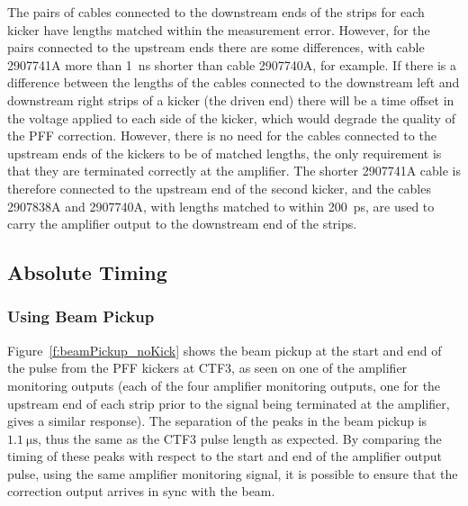 The pairs of cables connected to the downstream ends of the strips for
 each kicker have lengths matched within the measurement error.
 However, for the pairs connected to the upstream ends there are some differences, with cable 2907741A more than 1~ns shorter than cable 2907740A, for example. If there is a difference between the lengths of the cables connected to the downstream left and downstream right strips of a kicker (the driven end) there will be a time offset in the voltage applied to each side of the kicker, which would degrade the quality of the PFF correction. However, there is no need for the cables connected to the upstream ends of the kickers to be of matched lengths, the only requirement is that they are terminated correctly at the amplifier. The shorter 2907741A cable is therefore connected to the upstream end of the second kicker, and the cables 2907838A and 2907740A, with lengths matched to within 200~ps, are used to carry the amplifier output to the downstream end of the strips.


\subsection{Absolute Timing}
\label{ss:absTiming}



\subsubsection{Using Beam Pickup}
\label{sss:beamPickup}

Figure~\ref{f:beamPickup_noKick} shows the beam pickup at the start and end of the pulse from the PFF kickers at CTF3, as seen on one of the amplifier monitoring outputs (each of the four amplifier monitoring outputs, one for the upstream end of each strip prior to the signal being terminated at the amplifier, gives a similar response). The separation of the peaks in the beam pickup is \(1.1~\mathrm{\mu s}\), thus the same as the CTF3 pulse length as expected. By comparing the timing of these peaks with respect to the start and end of the amplifier output pulse, using the same amplifier monitoring signal, it is possible to ensure that the correction output arrives in sync with the beam.

